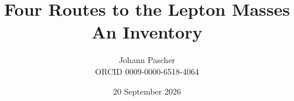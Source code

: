 \documentclass[11pt,a4paper]{report}
\title{Four Routes to the Lepton Masses\\[0.5em]\large An Inventory}
\date{20 September 2026}
\author{Johann Pascher\\\small ORCID 0009-0000-6518-4064}
\begin{document}
\renewcommand{\thechapter}{}
\renewcommand{\thesection}{\arabic{section}}
\maketitle
\tableofcontents

\end{document}
